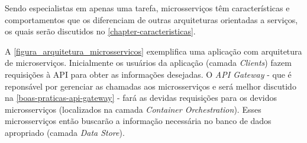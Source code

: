 Sendo especialistas em apenas uma tarefa, microsserviços têm características e comportamentos que os diferenciam de outras arquiteturas orientadas a serviços, os quais serão discutidos no \autoref{chapter-caracteristicas}.

A \autoref{figura_arquitetura_microsservicos} exemplifica uma aplicação com arquitetura de microserviços. Inicialmente os usuários da aplicação (camada \emph{Clients}) fazem requisições à API para obter as informações desejadas. O \emph{API Gateway} - que é reponsável por gerenciar as chamadas aos microsserviços e será melhor discutido na \autoref{boas-praticas-api-gateway} - fará as devidas requisições para os devidos microsserviços (localizados na camada \emph{Container Orchestration}). Esses microsserviços então buscarão a informação necessária no banco de dados apropriado (camada \emph{Data Store}).




